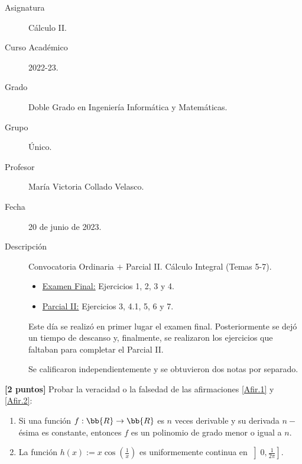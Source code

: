 \documentclass[12pt]{article}
\begin{document}

    
    

    \begin{description}
        \item[Asignatura] Cálculo II.
        \item[Curso Académico] 2022-23.
        \item[Grado] Doble Grado en Ingeniería Informática y Matemáticas.
        \item[Grupo] Único.
        \item[Profesor] María Victoria Collado Velasco.
        \item[Fecha] 20 de junio de 2023.
        \item[Descripción] Convocatoria Ordinaria $+$ Parcial II. Cálculo Integral (Temas 5-7).

        \begin{itemize}
            \item \underline{Examen Final:} Ejercicios 1, 2, 3 y 4.
            \item \underline{Parcial II:} Ejercicios 3, 4.1, 5, 6 y 7. 
        \end{itemize}

        Este día se realizó en primer lugar el examen final. Posteriormente se dejó un tiempo de descanso y, finalmente, se realizaron los ejercicios que faltaban para completar el Parcial II.

        Se calificaron independientemente y se obtuvieron dos notas por separado.
    
    \end{description}
    \newpage
    

\begin{ejercicio}\textbf{[2 puntos]}
    Probar la veracidad o la falsedad de las afirmaciones \ref{Afir.1} y \ref{Afir.2}:
    \begin{enumerate}
        \item \label{Afir.1} Si una función $f:\bb{R}\to \bb{R}$ es $n$ veces derivable y su derivada $n-$ésima es constante, entonces $f$ es un polinomio de grado menor o igual a $n$.
        
        \item \label{Afir.2} La función $h(x):=x\cos\left(\frac{1}{x}\right)$ es uniformemente continua en $\left]0,\frac{1}{2\pi}\right].$
    \end{enumerate}
        
\end{ejercicio}
\end{document}
